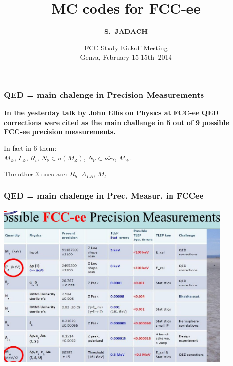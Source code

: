 \documentclass{beamer}
\title[Monte Carlo Methods] %
{ {\bf MC codes for FCC-ee}
} %
\author[S.~Jadach] %
{\Large\bf S.~JADACH }
\institute[Universities of Somewhere and Elsewhere] %
{ {\large\crd IFJ-PAN, Krak\'ow, Poland}\\
  {~~~}\\
  {\footnotesize
  Partly supported by Polish Government grant\\
  {\em Narodowe Centrum Nauki} DEC-2011/03/B/ST2/02632
}}
\date[Short Occasion] %
{\small FCC Study Kickoff Meeting\\
   Genva,
   February 15-15th, 2014
}
\newcommand{\cbl}{\color{blue}}
\begin{document}
\begin{frame}
  \titlepage
\end{frame}

\begin{frame}[fragile]
\frametitle{\bf QED = main chalenge in Precision Measurements}

\Large\bf
In the yesterday talk by John Ellis on Physics at FCC-ee
{\cbl QED corrections} were cited as the main challenge 
{\cbl in 5 out of 9}
possible FCC-ee precision measurements.

\vspace{2mm}
In fact in 6 them:\\
$M_Z$, $\Gamma_Z$, $R_l$, 
$N_\nu \in \sigma(M_Z)$, 
$N_\nu \in \nu\bar\nu\gamma$, 
$M_W$.

\vspace{2mm}
The other 3 ones are:
$R_b$, $A_{LR}$, $M_{t}$

\end{frame}





\begin{frame}[fragile]
\frametitle{\bf QED = main chalenge in Prec. Measur. in FCCee}

\vspace{-2mm}
{\includegraphics[width=118mm,height=85mm]{JEllis.jpg}}

\end{frame}
\end{document}
